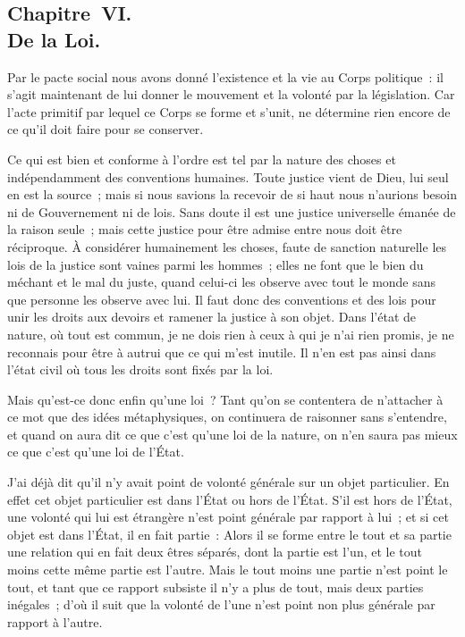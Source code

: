 \documentclass[french,twoside]{book} %
\begin{document}
\subsection[{Chapitre VI. De la Loi.}]{Chapitre VI. \\
De la Loi.}
\noindent Par le pacte social nous avons donné l’existence et la vie au Corps politique : il s’agit maintenant de lui donner le mouvement et la volonté par la législation. Car l’acte primitif par lequel ce Corps se forme et s’unit, ne détermine rien encore de ce qu’il doit faire pour se conserver.\par
Ce qui est bien et conforme à l’ordre est tel par la nature des choses et indépendamment des conventions humaines. Toute justice vient de Dieu, lui seul en est la source ; mais si nous savions la recevoir de si haut nous n’aurions besoin ni de Gouvernement ni de lois. Sans doute il est une justice universelle émanée de la raison seule ; mais cette justice pour être admise entre nous doit être réciproque. À considérer humainement les choses, faute de sanction naturelle les lois de la justice sont vaines parmi les hommes ; elles ne font que le bien du méchant et le mal du juste, quand celui-ci les observe avec tout le monde sans que personne les observe avec lui. Il faut donc des conventions et des lois pour unir les droits aux devoirs et ramener la justice à son objet. Dans l’état de nature, où tout est commun, je ne dois rien à ceux à qui je n’ai rien promis, je ne reconnais pour être à autrui que ce qui m’est inutile. Il n’en est pas ainsi dans l’état civil où tous les droits sont fixés par la loi.\par
Mais qu’est-ce donc enfin qu’une loi ? Tant qu’on se contentera de n’attacher à ce mot que des idées métaphysiques, on continuera de raisonner sans s’entendre, et quand on aura dit ce que c’est qu’une loi de la nature, on n’en saura pas mieux ce que c’est qu’une loi de l’État.\par
J’ai déjà dit qu’il n’y avait point de volonté générale sur un objet particulier. En effet cet objet particulier est dans l’État ou hors de l’État. S’il est hors de l’État, une volonté qui lui est étrangère n’est point générale par rapport à lui ; et si cet objet est dans l’État, il en fait partie : Alors il se forme entre le tout et sa partie une relation qui en fait deux êtres séparés, dont la partie est l’un, et le tout moins cette même partie est l’autre. Mais le tout moins une partie n’est point le tout, et tant que ce rapport subsiste il n’y a plus de tout, mais deux parties inégales ; d’où il suit que la volonté de l’une n’est point non plus générale par rapport à l’autre.\par
\end{document}
